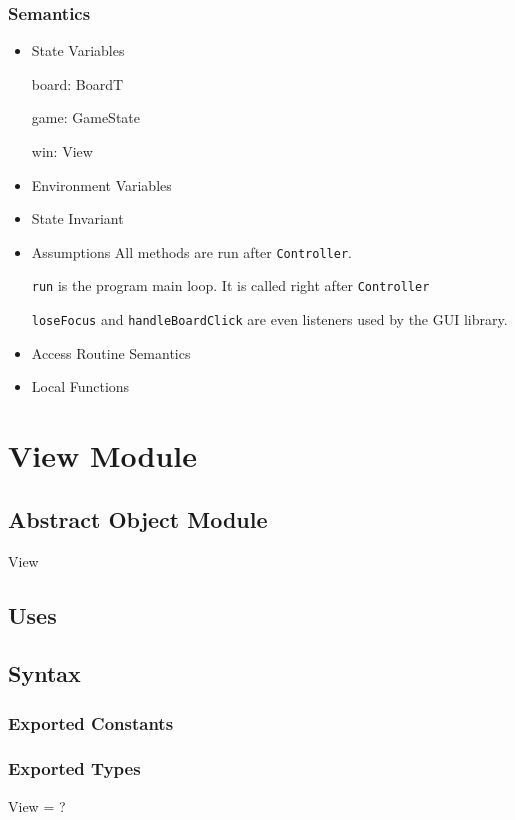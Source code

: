\documentclass[11pt]{article}
\begin{document}
\subsubsection*{Semantics}
\label{sec:orgc72cc40}
\begin{itemize}
\item State Variables
\label{sec:orga6a3b75}

board: BoardT

game: GameState

win: View

\item Environment Variables
\label{sec:org6ece77e}
\item State Invariant
\label{sec:org7e8f0b3}
\item Assumptions
\label{sec:org0f7aa10}
All methods are run after \texttt{Controller}.

\texttt{run} is the program main loop. It is called right after \texttt{Controller}

\texttt{loseFocus} and \texttt{handleBoardClick} are even listeners used by the GUI library.

\item Access Routine Semantics
\label{sec:org6e2c2cb}
\item Local Functions
\label{sec:org9ed07ec}
\end{itemize}

\section{View Module}
\label{sec:org1dcc1b2}
\subsection*{Abstract Object Module}
\label{sec:org93ec976}
View
\subsection*{Uses}
\label{sec:orgde7aa0d}

\subsection*{Syntax}
\label{sec:orgcb61432}
\subsubsection*{Exported Constants}
\label{sec:org4bce681}
\subsubsection*{Exported Types}
\label{sec:org457add1}
View = ?
\end{document}

